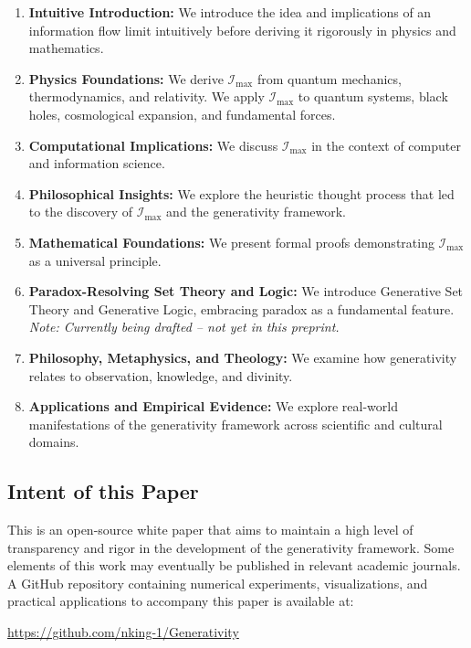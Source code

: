 \documentclass[12pt]{article}
\begin{document}
\begin{enumerate}
    \item \textbf{Intuitive Introduction:} We introduce the idea and implications of an information flow limit intuitively before deriving it rigorously in physics and mathematics.
    \item \textbf{Physics Foundations:} We derive $\mathcal{I}_{\text{max}}$ from quantum mechanics, thermodynamics, and relativity. We apply $\mathcal{I}_{\text{max}}$ to quantum systems, black holes, cosmological expansion, and fundamental forces.
    \item \textbf{Computational Implications:} We discuss $\mathcal{I}_{\text{max}}$ in the context of computer and information science.
    \item \textbf{Philosophical Insights:} We explore the heuristic thought process that led to the discovery of $\mathcal{I}_{\text{max}}$ and the generativity framework.
    \item \textbf{Mathematical Foundations:} We present formal proofs demonstrating $\mathcal{I}_{\text{max}}$ as a universal principle.
    \item \textbf{Paradox-Resolving Set Theory and Logic:} We introduce Generative Set Theory and Generative Logic, embracing paradox as a fundamental feature. \textit{Note: Currently being drafted -- not yet in this preprint.}
    \item \textbf{Philosophy, Metaphysics, and Theology:} We examine how generativity relates to observation, knowledge, and divinity.
    \item \textbf{Applications and Empirical Evidence:} We explore real-world manifestations of the generativity framework across scientific and cultural domains.
\end{enumerate}

\subsection{Intent of this Paper}

This is an open-source white paper that aims to maintain a high level of transparency and rigor in the development of the generativity framework. Some elements of this work may eventually be published in relevant academic journals. A GitHub repository containing numerical experiments, visualizations, and practical applications to accompany this paper is available at:
\begin{center}
    \url{https://github.com/nking-1/Generativity}
\end{center}
\end{document}
